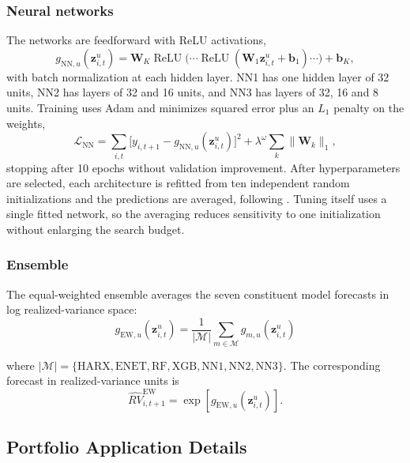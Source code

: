 \documentclass[preprint,12pt,authoryear]{elsarticle}
\begin{document}
\begin{appendices}
\subsubsection{Neural networks}

The networks are feedforward with ReLU activations,
\begin{equation}
g_{\mathrm{NN},u}(\mathbf{z}^{u}_{i,t}) = \mathbf{W}_{K}\operatorname{ReLU}
 \bigl(\cdots \operatorname{ReLU}(\mathbf{W}_{1}\mathbf{z}^{u}_{i,t} +
 \mathbf{b}_{1}) \cdots \bigr) + \mathbf{b}_{K},
\end{equation}
with batch normalization at each hidden layer. NN1 has one hidden layer of 32 units, NN2 has layers of 32 and 16 units, and NN3 has layers of 32, 16 and 8 units. Training uses Adam and minimizes squared error plus an $L_1$ penalty on
the weights,
\begin{equation}
\mathcal{L}_{\mathrm{NN}} = \sum_{i,t}
 \bigl[y_{i,t+1} - g_{\mathrm{NN},u}(\mathbf{z}^{u}_{i,t})\bigr]^{2}
 + \lambda^{\omega} \sum_k \lVert \mathbf{W}_k \rVert_1,
\end{equation}
stopping after 10 epochs without validation improvement. After hyperparameters are selected, each architecture is refitted from ten independent random initializations and the predictions are averaged, following \citet{gukellyxiu2020}. Tuning itself uses a single fitted network, so the averaging reduces sensitivity to one initialization without enlarging the search budget.

\subsubsection{Ensemble}

The equal-weighted ensemble averages the seven constituent model forecasts in log realized-variance space:
\begin{equation}
g_{\mathrm{EW},u}(\mathbf{z}^{u}_{i,t})
=
\frac{1}{|\mathcal{M}|}
\sum_{m\in\mathcal{M}}
g_{m,u}(\mathbf{z}^{u}_{i,t})
\end{equation}

where $|\mathcal{M}|=\{\mathrm{HARX},\mathrm{ENET},\mathrm{RF},\mathrm{XGB},
\mathrm{NN1},\mathrm{NN2},\mathrm{NN3}\}$. 
The corresponding forecast in realized-variance units is
\[
\widehat{RV}^{\mathrm{EW}}_{i,t+1}
=
\exp\!\left[
g_{\mathrm{EW},u}(\mathbf{z}^{u}_{i,t})
\right].
\]

\subsection{Portfolio Application Details}
\label{app:portfolio-design}


\end{appendices}
\end{document}

